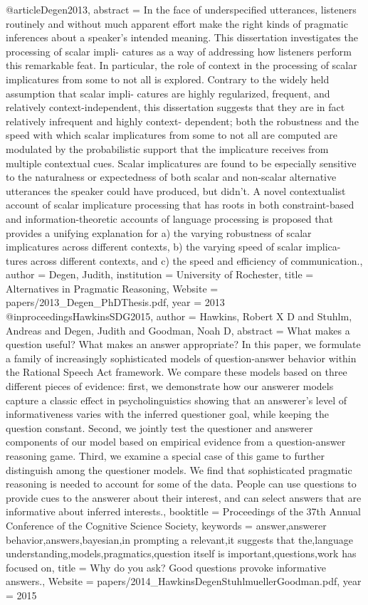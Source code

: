 @article{Degen2013,
abstract = {In the face of underspecified utterances, listeners routinely and without much apparent effort make the right kinds of pragmatic inferences about a speaker's intended meaning. This dissertation investigates the processing of scalar impli- catures as a way of addressing how listeners perform this remarkable feat. In particular, the role of context in the processing of scalar implicatures from some to not all is explored. Contrary to the widely held assumption that scalar impli- catures are highly regularized, frequent, and relatively context-independent, this dissertation suggests that they are in fact relatively infrequent and highly context- dependent; both the robustness and the speed with which scalar implicatures from some to not all are computed are modulated by the probabilistic support that the implicature receives from multiple contextual cues. Scalar implicatures are found to be especially sensitive to the naturalness or expectedness of both scalar and non-scalar alternative utterances the speaker could have produced, but didn't. A novel contextualist account of scalar implicature processing that has roots in both constraint-based and information-theoretic accounts of language processing is proposed that provides a unifying explanation for a) the varying robustness of scalar implicatures across different contexts, b) the varying speed of scalar implica- tures across different contexts, and c) the speed and efficiency of communication.},
author = {Degen, Judith},
institution = {University of Rochester},
title = {{Alternatives in Pragmatic Reasoning}},
Website = {papers/2013_Degen_PhDThesis.pdf},
year = {2013}
}
@inproceedings{HawkinsSDG2015,
author = {Hawkins, Robert X D and Stuhlm, Andreas and Degen, Judith and Goodman, Noah D},
abstract = {What makes a question useful? What makes an answer appropriate? In this paper, we formulate a family of increasingly sophisticated models of question-answer behavior within the Rational Speech Act framework. We compare these models based on three different pieces of evidence: first, we demonstrate how our answerer models capture a classic effect in psycholinguistics showing that an answerer’s level of informativeness varies with the inferred questioner goal, while keeping the question constant. Second, we jointly test the questioner and answerer components of our model based on empirical evidence from a question-answer reasoning game. Third, we examine a special case of this game to further distinguish among the questioner models. We find that sophisticated pragmatic reasoning is needed to account for some of the data. People can use questions to provide cues to the answerer about their interest, and can select answers that are informative about inferred interests.},
booktitle = {Proceedings of the 37th Annual Conference of the Cognitive Science Society},
keywords = {answer,answerer behavior,answers,bayesian,in prompting a relevant,it suggests that the,language understanding,models,pragmatics,question itself is important,questions,work has focused on},
title = {{Why do you ask? Good questions provoke informative answers.}},
Website = {papers/2014_HawkinsDegenStuhlmuellerGoodman.pdf},
year = {2015}
}
